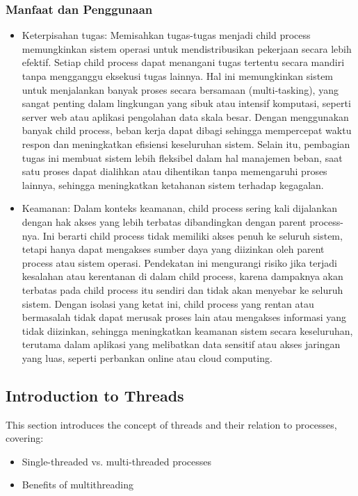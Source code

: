 \documentclass[12pt]{article}
\begin{document}
\subsubsection{Manfaat dan Penggunaan}

\begin{itemize}
    \item Keterpisahan tugas: Memisahkan tugas-tugas menjadi child process memungkinkan sistem operasi untuk mendistribusikan pekerjaan secara lebih efektif. Setiap child process dapat menangani tugas tertentu secara mandiri tanpa mengganggu eksekusi tugas lainnya. Hal ini memungkinkan sistem untuk menjalankan banyak proses secara bersamaan (multi-tasking), yang sangat penting dalam lingkungan yang sibuk atau intensif komputasi, seperti server web atau aplikasi pengolahan data skala besar. Dengan menggunakan banyak child process, beban kerja dapat dibagi sehingga mempercepat waktu respon dan meningkatkan efisiensi keseluruhan sistem. Selain itu, pembagian tugas ini membuat sistem lebih fleksibel dalam hal manajemen beban, saat satu proses dapat dialihkan atau dihentikan tanpa memengaruhi proses lainnya, sehingga meningkatkan ketahanan sistem terhadap kegagalan.

    \item Keamanan: Dalam konteks keamanan, child process sering kali dijalankan dengan hak akses yang lebih terbatas dibandingkan dengan parent process-nya. Ini berarti child process tidak memiliki akses penuh ke seluruh sistem, tetapi hanya dapat mengakses sumber daya yang diizinkan oleh parent process atau sistem operasi. Pendekatan ini mengurangi risiko jika terjadi kesalahan atau kerentanan di dalam child process, karena dampaknya akan terbatas pada child process itu sendiri dan tidak akan menyebar ke seluruh sistem. Dengan isolasi yang ketat ini, child process yang rentan atau bermasalah tidak dapat merusak proses lain atau mengakses informasi yang tidak diizinkan, sehingga meningkatkan keamanan sistem secara keseluruhan, terutama dalam aplikasi yang melibatkan data sensitif atau akses jaringan yang luas, seperti perbankan online atau cloud computing.
\end{itemize}

\subsection{Introduction to Threads}
This section introduces the concept of threads and their relation to processes, covering:
\begin{itemize}
    \item Single-threaded vs. multi-threaded processes
    \item Benefits of multithreading
\end{itemize}
\end{document}
